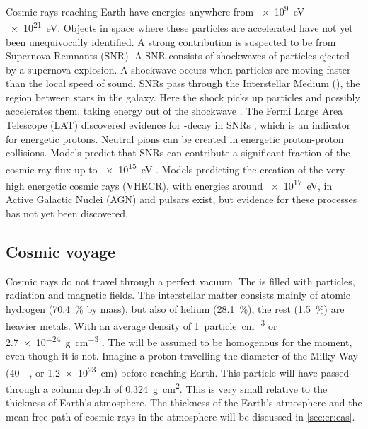 Cosmic rays reaching Earth have energies anywhere from \SIrange{e9}{e21}{\eV}. Objects in space where these particles are accelerated have not yet been unequivocally identified. A strong contribution is suspected to be from Supernova Remnants (SNR). A SNR consists of shockwaves of particles ejected by a supernova explosion. A shockwave occurs when particles are moving faster than the local speed of sound. SNRs pass through the Interstellar Medium (\ism), the region between stars in the galaxy. Here the shock picks up particles and possibly accelerates them, taking energy out of the shockwave \cite{helder2009snr}. The Fermi Large Area Telescope (LAT) discovered evidence for \Pgpz-decay in SNRs \cite{ackermann2013snr}, which is an indicator for energetic protons. Neutral pions can be created in energetic proton-proton collisions. Models predict that SNRs can contribute a significant fraction of the cosmic-ray flux up to \SI{e15}{\eV} \cite{cardillo2015snr}. Models predicting the creation of the very high energetic cosmic rays (VHECR), with energies around \SI{e17}{\eV}, in Active Galactic Nuclei (AGN) and pulsars exist, but evidence for these processes has not yet been discovered.


\subsection{Cosmic voyage}

Cosmic rays do not travel through a perfect vacuum. The \ism is filled with particles, radiation and magnetic fields. The interstellar matter consists mainly of atomic hydrogen (\SI{70.4}{\percent} by mass), but also of helium (\SI{28.1}{\percent}), the rest (\SI{1.5}{\percent}) are heavier metals. With an average density of \SI{1}{particle\per\centi\meter\cubed} or \SI{2.7e-24}{\gram\per\centi\meter\cubed} \cite{ferriere2001ism}. The \ism will be assumed to be homogenous for the moment, even though it is not. Imagine a proton travelling the diameter of the Milky Way (\SI{40}{\kilo\parsec}, or \SI{1.2e23}{\cm}) before reaching Earth. This particle will have passed through a column depth of \SI{0.324}{\gram\centi\meter\squared}. This is very small relative to the thickness of Earth's atmosphere. The thickness of the Earth's atmosphere and the mean free path of cosmic rays in the atmosphere will be discussed in \cref{sec:cr:eas}.

